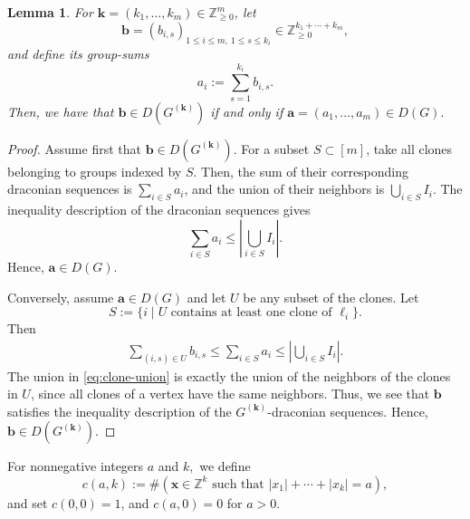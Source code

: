 \documentclass[11pt,a4paper]{article}
\newcommand{\vct}[1]{\boldsymbol{#1}}
\newcommand{\Z}{\mathbb{Z}}
\newcommand{\1}{\mathbf{1}}
\theoremstyle{plain}
\newtheorem{lemma}[theorem]{Lemma}
\theoremstyle{definition}
\begin{document}
\begin{lemma}\label{lem:group-sums-draconion-sequences} For $\vct{k}=(k_1,\ldots,k_m)\in\Z_{\ge0}^m$, let
\[
\vct{b}=(b_{i,s})_{1\le i\le m,\ 1\le s\le k_i}
\in\Z_{\ge0}^{k_1+\cdots+k_m},
\]
and define its \emph{group-sums}
\[
a_i:=\sum_{s=1}^{k_i}b_{i,s}.
\]
Then, we have that $\vct{b}\in D(G^{(\vct{k})})
$ if and only if $\vct{a}=(a_1,\ldots,a_m)\in D(G).$
\end{lemma}
\begin{proof}
Assume first that $\vct{b}\in D(G^{(\vct{k})})$. For a subset $S\subset[m]$, take all clones belonging to groups indexed by $S$. Then, the sum of their corresponding draconian sequences is $\sum_{i\in S}a_i$, and the union of their neighbors is $\bigcup_{i\in S}I_i$. The inequality description of the draconian sequences gives
\[
\sum_{i\in S}a_i\le\left|\bigcup_{i\in S}I_i\right|.
\]
Hence, $\vct{a}\in D(G)$.

Conversely, assume $\vct{a}\in D(G)$ and let $U$ be any subset of the clones. Let
\[
S:=\{i\mid U\text{ contains at least one clone of }\ell_i\}.
\]
Then
\begin{align}\label{eq:clone-union}
    \sum_{(i,s)\in U}b_{i,s}
\le\sum_{i\in S}a_i
\le\left|\bigcup_{i\in S}I_i\right|.
\end{align}
The union in \eqref{eq:clone-union} is exactly the union of the neighbors of the clones in $U$, since all clones of a vertex have the same neighbors. Thus, we see that $\vct{b}$ satisfies the inequality description of the $G^{(\vct{k})}$-draconian sequences. Hence, $\vct{b} \in D(G^{(\vct{k})}).$
\end{proof}

For nonnegative integers $a$ and $k,$ we define
\begin{equation}
c(a,k):=\#(\vct{x}\in\Z^k \text{ such that } |x_1|+\cdots+|x_k|=a),
\label{eq:c-def}
\end{equation}
and set $c(0,0)=1$, and $c(a,0)=0$ for $a>0$.
\end{document}
